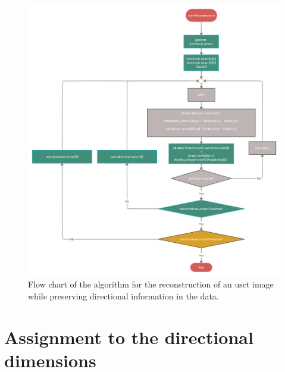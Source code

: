 \begin{figure}[H]
    \centering
    \includegraphics[width=1.13\textwidth]{Graphics/AngleIndex_Algorithm.png}
    \caption{Flow chart of the algorithm for the reconstruction of an \ac{usct} image while preserving directional information in the data.}
    \label{Basic_Algo_Angle_ident}
\end{figure}





\newpage

\section{Assignment to the directional dimensions}
\label{sec:index_ident}

